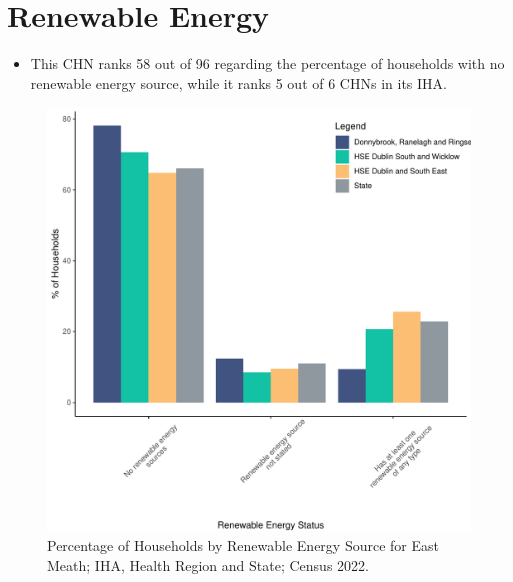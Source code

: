 \documentclass{article}
\begin{document}
\section{Renewable Energy}\label{sect:RE}
\begin{itemize}
\item This CHN ranks  58 out of 96 regarding the percentage of households with no renewable energy source, while it ranks   5 out of 6 CHNs in its IHA.
\end{itemize}
\begin{figure}[H]
	\centering
	\includegraphics[width = 140mm]{../figures/RenewableEnergyED.pdf}
	\caption{Percentage of Households by Renewable Energy Source for East Meath; IHA, Health Region and State; Census 2022.}
	\label{fig:vbnv}
	\end{figure}
\end{document}
